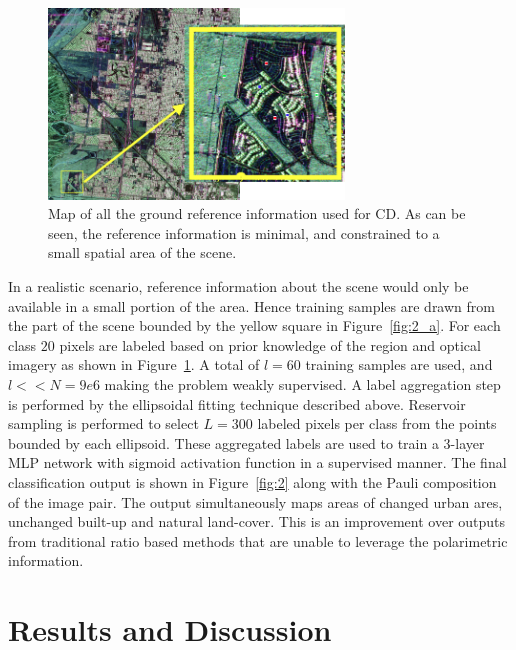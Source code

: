 \begin{figure}
\centering
\includegraphics[width = 0.7\textwidth]{Figures/CD/ADD/plot}
\caption{Map of all the ground reference information used for CD. As can be seen, the reference information is minimal, and constrained to a small spatial area of the scene.}
\label{fig:const}
\end{figure}

In a realistic scenario, reference information about the scene would only be available in a small portion of the area. Hence training samples are drawn from the part of the scene bounded by the yellow square in Figure~\ref{fig:2_a}. For each class $20$ pixels are labeled based on prior knowledge of the region and optical imagery as shown in Figure~\ref{fig:const}. A total of $l=60$ training samples are  used, and $l<<N=9e6$ making the problem weakly supervised. A label aggregation step is performed by the ellipsoidal fitting technique described above. Reservoir sampling is performed to select $L=300$ labeled pixels per class from the points bounded by each ellipsoid. These aggregated labels are used to train a 3-layer MLP network with sigmoid activation function in a supervised manner. The final classification output   is shown in Figure~\ref{fig:2} along with the Pauli composition of the image pair. The output simultaneously maps areas of changed urban ares, unchanged built-up and  natural land-cover. This is an improvement over outputs from  traditional ratio based methods that are unable to leverage the polarimetric information. 

\section{Results and Discussion}
\label{sec:resultsA1}

